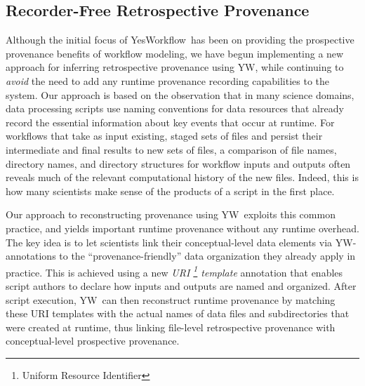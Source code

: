\documentclass[letterpaper,twocolumn,10pt]{article}
\newcommand{\YW}{\textsf{YesWorkflow}}
\newcommand{\yw}{\textsf{YW}}
\begin{document}
\subsection*{Recorder-Free Retrospective Provenance} 
Although the initial focus of \YW\ has been on providing the
prospective provenance benefits of %
workflow modeling, we have begun implementing a new approach for
inferring retrospective provenance using \yw, while continuing to
\emph{avoid} the need to add any runtime provenance recording
capabilities to the system. Our approach is based on the observation
that in many science domains, data processing scripts use naming
conventions for data resources that already record the essential
information about key events that occur at runtime. For workflows that
take as input existing, staged sets of files and persist their
intermediate and final results to new sets of files, a comparison of
file names, directory names, and directory structures for workflow
inputs and outputs often reveals much of the relevant computational
history of the new files. Indeed, this is how many scientists make
sense of the products of a script in the first place.

Our approach to reconstructing provenance using \yw\ exploits this
common practice, and yields important runtime provenance without any
runtime overhead. The key idea is to let scientists link their
conceptual-level data elements via \yw-annotations to the
``provenance-friendly'' data organization they already apply in
practice. This is achieved using a new \emph{URI \footnote{Uniform Resource
    Identifier} template} annotation
that enables script authors to declare how inputs and outputs are
named and organized. After script execution, \yw\ can then reconstruct
runtime provenance by matching these URI templates with the actual
names of data files and subdirectories that were created at runtime,
thus linking file-level retrospective provenance with conceptual-level
prospective provenance.
\end{document}
